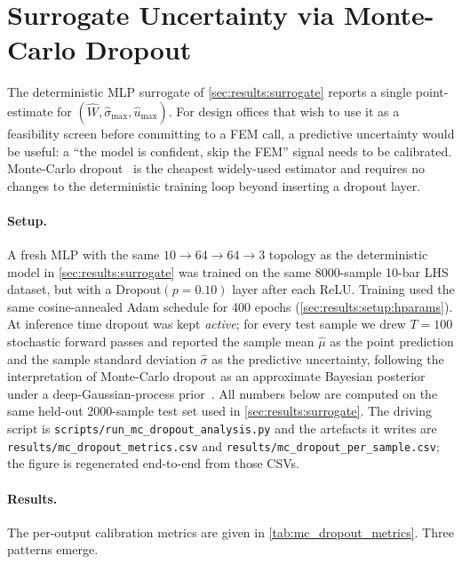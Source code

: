 \section{Surrogate Uncertainty via Monte-Carlo Dropout}
\label{sec:results:mc_dropout}

The deterministic MLP surrogate of \cref{sec:results:surrogate}
reports a single point-estimate for
$(\hat{W},\hat{\sigma}_{\max},\hat{u}_{\max})$. For design offices
that wish to use it as a feasibility screen before committing to a
FEM call, a predictive uncertainty would be useful: a ``the model
is confident, skip the FEM'' signal needs to be calibrated.
Monte-Carlo dropout~\cite{gal2016dropout} is the cheapest widely-used
estimator and requires no changes to the deterministic training
loop beyond inserting a dropout layer.

\paragraph{Setup.} A fresh MLP with the same
$10\!\to\!64\!\to\!64\!\to\!3$ topology as the deterministic model
in \cref{sec:results:surrogate} was trained on the same 8000-sample
10-bar LHS dataset, but with a
$\mathrm{Dropout}(p=\num{0.10})$ layer after each ReLU. Training
used the same cosine-annealed Adam schedule for 400 epochs
(\cref{sec:results:setup:hparams}). At inference time dropout was kept
\emph{active}; for every test sample we drew $T=\num{100}$
stochastic forward passes and reported the sample mean $\hat\mu$
as the point prediction and the sample standard deviation $\hat\sigma$
as the predictive uncertainty, following the interpretation of
Monte-Carlo dropout as an approximate Bayesian posterior under a
deep-Gaussian-process prior~\cite{gal2016dropout}. All numbers
below are computed on the same held-out 2000-sample test set used
in \cref{sec:results:surrogate}. The driving script is
\texttt{scripts/run\_mc\_dropout\_analysis.py} and the artefacts it
writes are \texttt{results/mc\_dropout\_metrics.csv} and
\texttt{results/mc\_dropout\_per\_sample.csv}; the figure is
regenerated end-to-end from those CSVs.

\paragraph{Results.} The per-output calibration metrics are given in
\cref{tab:mc_dropout_metrics}. Three patterns emerge.

